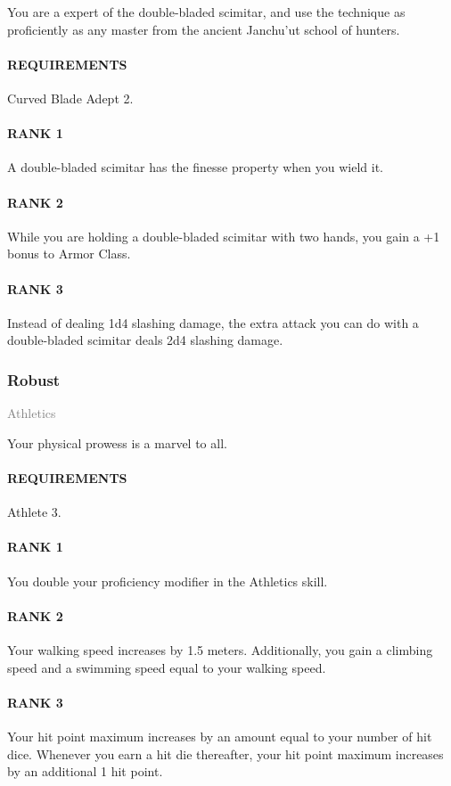 \normalsize
You are a expert of the double-bladed scimitar, and use the technique as proficiently as any master from the ancient Janchu'ut school of hunters.
\paragraph{REQUIREMENTS} Curved Blade Adept 2.
\paragraph{RANK 1} A double-bladed scimitar has the finesse property when you wield it.
\paragraph{RANK 2} While you are holding a double-bladed scimitar with two hands, you gain a +1 bonus to Armor Class.
\paragraph{RANK 3} Instead of dealing 1d4 slashing damage, the extra attack you can do with a double-bladed scimitar deals 2d4 slashing damage.

\subsubsection{Robust} \label{tal::robust}
\small \textcolor{gray}{Athletics}

\normalsize
Your physical prowess is a marvel to all.
\paragraph{REQUIREMENTS} Athlete 3.
\paragraph{RANK 1} You double your proficiency modifier in the Athletics skill.
\paragraph{RANK 2} Your walking speed increases by 1.5 meters.
Additionally, you gain a climbing speed and a swimming speed equal to your walking speed.
\paragraph{RANK 3} Your hit point maximum increases by an amount equal to your number of hit dice.
Whenever you earn a hit die thereafter, your hit point maximum increases by an additional 1 hit point.

